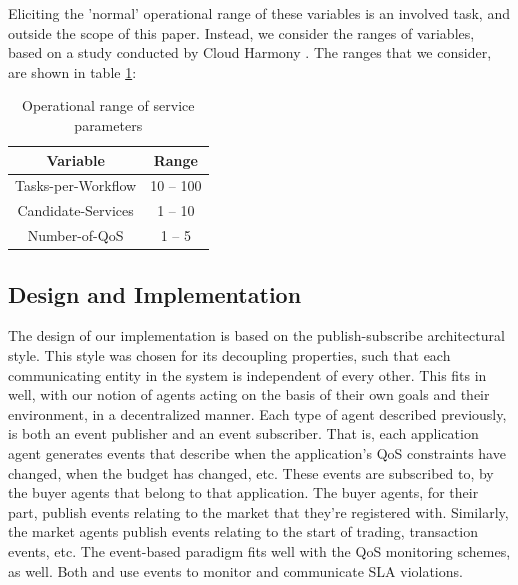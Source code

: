 \documentclass[10pt,journal,compsoc]{IEEEtran}
\begin{document}
Eliciting the 'normal' operational range of these variables is an involved task, and outside the scope of this paper. Instead, we consider the ranges of variables, based on a study conducted by Cloud Harmony \cite{2011CloudHarmonyStudy}. The ranges that we consider, are shown in table \ref{scaling_range}:
\begin{table}
\begin{tabular}{|c|c|}
\hline
\textbf{Variable} &  \textbf{Range} \\ \hline
Tasks-per-Workflow & 10 -- 100 \\ \hline
Candidate-Services & 1 -- 10 \\ \hline
Number-of-QoS & 1 -- 5 \\ \hline
\end{tabular}
 \label{scaling_range}
 \caption{Operational range of service parameters}
\end{table}

\subsection{Design and Implementation}
The design of our implementation is based on the publish-subscribe architectural style. This style was chosen for its decoupling properties, such that each communicating entity in the system is independent of every other. This fits in well, with our notion of agents acting on the basis of their own goals and their environment, in a decentralized manner. Each type of agent described previously, is both an event publisher and an event subscriber. That is, each application agent generates events that describe when the application's QoS constraints have changed, when the budget has changed, etc. These events are subscribed to, by the buyer agents that belong to that application. The buyer agents, for their part, publish events relating to the market that they're registered with. Similarly, the market agents publish events relating to the start of trading, transaction events, etc. The event-based paradigm fits well with the QoS monitoring schemes, as well. Both \cite{Zeng2007Monitoring} and \cite{Michlmayr2009Comprehensive} use events to monitor and communicate SLA violations. \\
\end{document}
